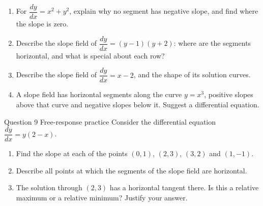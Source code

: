 \documentclass[11pt]{article}
\begin{document}
\begin{enumerate}[leftmargin=*,itemsep=2pt,start=5]
  \item For $\dfrac{dy}{dx}=x^2+y^2$, explain why no segment has negative slope, and find where the slope is zero.\work{2.8cm}
  \item Describe the slope field of $\dfrac{dy}{dx}=(y-1)(y+2)$: where are the segments horizontal, and what is special about each row?\work{2.8cm}
  \item Describe the slope field of $\dfrac{dy}{dx}=x-2$, and the shape of its solution curves.\work{2.8cm}
  \item A slope field has horizontal segments along the curve $y=x^3$, positive slopes above that curve and negative slopes below it. Suggest a differential equation.\work{2.8cm}
\end{enumerate}

\begin{frbox}{Question 9 \textperiodcentered{} Free-response practice}
Consider the differential equation $\dfrac{dy}{dx}=y(2-x)$.
\begin{enumerate}[label=(\alph*),leftmargin=*,itemsep=2pt]
  \item Find the slope at each of the points $(0,1)$, $(2,3)$, $(3,2)$ and $(1,-1)$.\work{2.6cm}
  \item Describe all points at which the segments of the slope field are horizontal.\work{2.6cm}
  \item The solution through $(2,3)$ has a horizontal tangent there. Is this a relative maximum or a relative minimum? Justify your answer.\work{2.6cm}
\end{enumerate}
\end{frbox}
\end{document}
